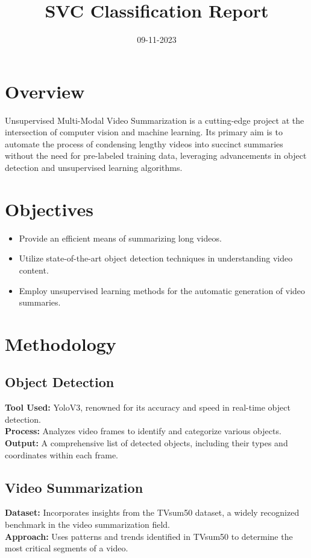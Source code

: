 \documentclass[conference]{IEEEtran}
\title{\Huge SVC Classification Report}
\author{\IEEEauthorblockN{Papagrigoriou Vasileios Savvas}
\IEEEauthorblockA{Auth}}
\date{09-11-2023}
\begin{document}
\maketitle

\section*{Overview}
Unsupervised Multi-Modal Video Summarization is a cutting-edge project at the intersection of computer vision and machine learning. Its primary aim is to automate the process of condensing lengthy videos into succinct summaries without the need for pre-labeled training data, leveraging advancements in object detection and unsupervised learning algorithms.

\section*{Objectives}
\begin{itemize}
    \item Provide an efficient means of summarizing long videos.
    \item Utilize state-of-the-art object detection techniques in understanding video content.
    \item Employ unsupervised learning methods for the automatic generation of video summaries.
\end{itemize}

\section*{Methodology}
\subsection*{Object Detection}
\textbf{Tool Used:} YoloV3, renowned for its accuracy and speed in real-time object detection.\\
\textbf{Process:} Analyzes video frames to identify and categorize various objects.\\
\textbf{Output:} A comprehensive list of detected objects, including their types and coordinates within each frame.

\subsection*{Video Summarization}
\textbf{Dataset:} Incorporates insights from the TVsum50 dataset, a widely recognized benchmark in the video summarization field.\\
\textbf{Approach:} Uses patterns and trends identified in TVsum50 to determine the most critical segments of a video.
\end{document}
